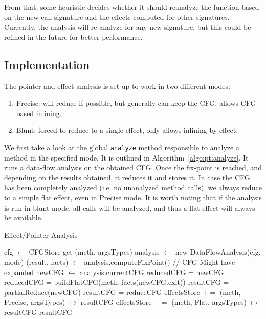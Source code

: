 \documentclass[a4paper]{article}
\begin{document}
From that, some heuristic decides whether it should reanalyze the function
based on the new call-signature and the effects computed for other signatures.
Currently, the analysis will re-analyze for any new signature, but this could
be refined in the future for better performance.

\subsection{Implementation}
The pointer and effect analysis is set up to work in two different modes:
\begin{enumerate}
    \item Precise: will reduce if possible, but generally can keep the CFG,
    allows CFG-based inlining.
    \item Blunt: forced to reduce to a single effect, only allows inlining by
    effect.
\end{enumerate}

We first take a look at the global \verb=analyze= method responsible to analyze
a method in the specified mode. It is outlined in
Algorithm~\ref{algo:pt:analyze}. It runs a data-flow analysis on the obtained
CFG.  Once the fix-point is reached, and depending on the results obtained, it
reduces it and stores it. In case the CFG has been completely analyzed (i.e. no
unanalyzed method calls), we always reduce to a simple flat effect, even in
Precise mode. It is worth noting that if the analysis is run in blunt mode, all
calls will be analyzed, and thus a flat effect will always be available.

\begin{algorithm}
\caption{Effect/Pointer Analysis}\label{algo:pt:analyze}
\begin{algorithmic}[1]
    \State cfg $\gets$ CFGStore get (meth, argsTypes)
    \State analysis $\gets$ new DataFlowAnalysis(cfg, mode)
    \State (result, facts) $\gets$ analysis.computeFixPoint()
    \State // CFG Might have expanded
    \State newCFG $\gets$ analysis.currentCFG
        \State reducedCFG = newCFG
    \Else
        \State reducedCFG = buildFlatCFG(meth, facts(newCFG.exit))
    \EndIf
    \State
        \State resultCFG = partialReduce(newCFG)
    \Else
        \State resultCFG = reduceCFG
    \EndIf
    \State
        \State effectsStore $+=$ (meth, Precise, argsTypes) $\mapsto$ resultCFG
    \EndIf
    \State
        \State effectsStore $+=$ (meth, Flat, argsTypes) $\mapsto$ resultCFG
    \EndIf
    \State
    \State \Return resultCFG
\EndFunction
\end{algorithmic}
\end{algorithm}
\end{document}
